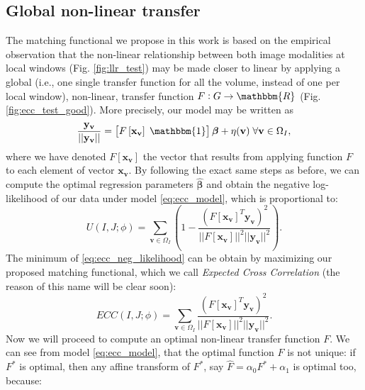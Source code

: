 \subsection{Global non-linear transfer}
The matching functional we propose in this work is based on the empirical observation that the non-linear relationship between both image modalities at local windows (Fig. \ref{fig:llr_test}) may be made closer to linear by applying a global (i.e., one single transfer function for all the volume, instead of one per local window), non-linear, transfer function $F: G \rightarrow \mathbbm{R}$ (Fig. \ref{fig:ecc_test_good}). More precisely, our model may be written as
\begin{equation}\label{eq:ecc_model}
    \frac{\mathbf{y}_{\mathbf{v}}}{||\mathbf{y}_{\mathbf{v}}||} = \left[F\left[\mathbf{x}_{\mathbf{v}}\right] \; \mathbbm{1}\right]\boldsymbol{\beta} + \eta(\mathbf{v}) \; \forall \mathbf{v} \in\Omega_{I},
\end{equation}
where we have denoted $F[\mathbf{x}_{\mathbf{v}}]$ the vector that results from applying function $F$ to each element of vector $\mathbf{x}_{\mathbf{v}}$. By following the exact same steps as before, we can compute the optimal regression parameters $\widehat{\boldsymbol{\beta}}$ and obtain the negative log-likelihood of our data under model \eqref{eq:ecc_model}, which is proportional to:
\begin{equation}\label{eq:ecc_neg_likelihood}
    U(I, J;\phi) = \sum_{\mathbf{v} \in\Omega_{I}}\left(1-\frac{\left(F\left[\mathbf{x}_{\mathbf{v}}\right]^{T} \mathbf{y}_{\mathbf{v}}\right)^{2}}{||F\left[\mathbf{x}_{\mathbf{v}}\right]||^{2}||\mathbf{y}_{\mathbf{v}}||^{2}}\right).
\end{equation}
The minimum of \eqref{eq:ecc_neg_likelihood} can be obtain by maximizing our proposed matching functional, which we call \emph{Expected Cross Correlation} (the reason of this name will be clear soon):
\begin{equation}\label{eq:ecc_functional}
    ECC(I, J;\phi) = \sum_{\mathbf{v} \in\Omega_{I}}\frac{\left(F\left[\mathbf{x}_{\mathbf{v}}\right]^{T} \mathbf{y}_{\mathbf{v}}\right)^{2}}{||F\left[\mathbf{x}_{\mathbf{v}}\right]||^{2}||\mathbf{y}_{\mathbf{v}}||^{2}}.
\end{equation}
Now we will proceed to compute an optimal non-linear transfer function $F$. We can see from model \eqref{eq:ecc_model}, that the optimal function $F$ is not unique: if $F^{*}$ is optimal, then any affine transform of $F^{*}$, say $\widehat{F} = \alpha_{0} F^{*} + \alpha_{1}$ is optimal too, because:
